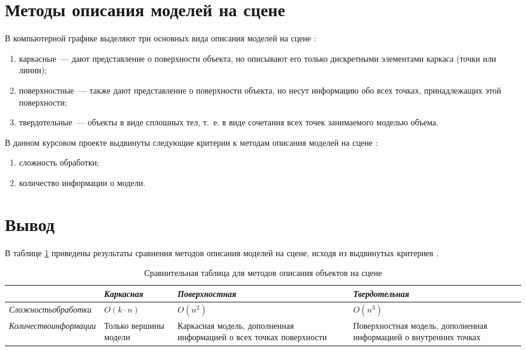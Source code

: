 \section{Методы описания моделей на сцене}

В компьютерной графике выделяют три основных вида описания моделей на сцене \cite{models}:
\begin{enumerate}
	\item каркасные~--- дают представление о поверхности объекта, но описывают его только дискретными элементами каркаса (точки или линии);
	\item поверхностные~--- также дают представление о поверхности объекта, но несут информацию обо всех точках, принадлежащих этой поверхности;
	\item твердотельные~--- объекты в виде сплошных тел, т.~е. в виде сочетания всех точек занимаемого моделью объема.
\end{enumerate}

В данном курсовом проекте выдвинуты следующие критерии к методам описания моделей на сцене \cite{compareModels1}:
\begin{enumerate}
	\item сложность обработки;
	\item количество информации о модели.
\end{enumerate}

\section*{Вывод}

В таблице \ref{table:compareModels} приведены результаты сравнения методов описания моделей на сцене, исходя из выдвинутых критериев \cite{compareModels2}.
\begin{table}[h!]
	\begin{center}
		\caption{\label{table:compareModels} Сравнительная таблица для методов описания объектов на сцене}
		\begin{tabular}{|p{100pt}|p{100pt}|p{120pt}|p{120pt}|}
			\hline
			~ & \textit{Каркасная} & \textit{Поверхностная} & \textit{Твердотельная} \\ \hline
			\textit{Сложность\newline обработки} & $O(k \cdot n)$ & $O(n^2)$ & $O(n^3)$ \\ \hline
			\textit{Количество\newline информации} & Только вершины модели & Каркасная модель, дополненная информацией о всех точках поверхности & Поверхностная модель, дополненная информацией о внутренних точках \\ \hline
		\end{tabular}
	\end{center}
\end{table}

